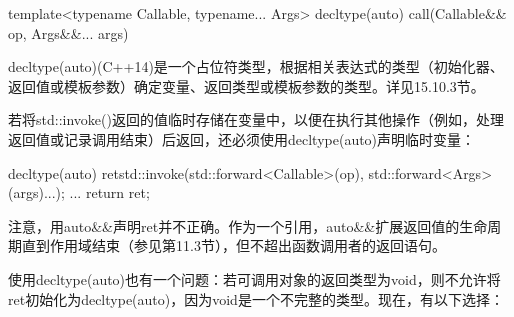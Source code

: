 \begin{cpp}
template<typename Callable, typename... Args>
decltype(auto) call(Callable&& op, Args&&... args)
\end{cpp}

decltype(auto)(C++14)是一个占位符类型，根据相关表达式的类型（初始化器、返回值或模板参数）确定变量、返回类型或模板参数的类型。详见15.10.3节。

若将std::invoke()返回的值临时存储在变量中，以便在执行其他操作（例如，处理返回值或记录调用结束）后返回，还必须使用decltype(auto)声明临时变量：

\begin{cpp}
decltype(auto) ret{std::invoke(std::forward<Callable>(op),
				   std::forward<Args>(args)...)};
...
return ret;
\end{cpp}

注意，用auto\&\&声明ret并不正确。作为一个引用，auto\&\&扩展返回值的生命周期直到作用域结束（参见第11.3节），但不超出函数调用者的返回语句。

使用decltype(auto)也有一个问题：若可调用对象的返回类型为void，则不允许将ret初始化为decltype(auto)，因为void是一个不完整的类型。现在，有以下选择：

